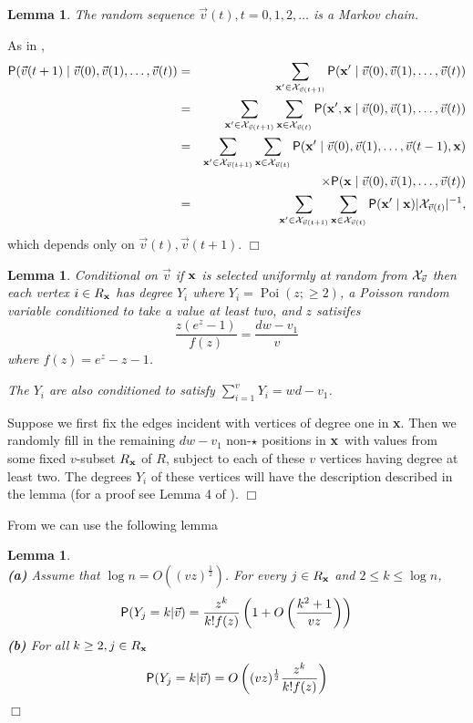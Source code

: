 \documentclass[11pt]{article}
\newcommand{\half}{\frac{1}{2}}
\newenvironment{proof}{{\bf Proof:}}{\hfill\mbox{$\Box$}}
\def\bx{{\bf x}}
\def\bx{{\bf x}}
\newcommand{\proofend}{\hspace*{\fill}\mbox{$\Box$}}
\def\cX{{\cal X}}
\def\Pr{{\sf P}}
\def\Gv{\cX_{\vv}}
\def\Poi{\mathop{\mathrm{Poi}}}
\def\vv{\vec{v}}
\newtheorem{lemma}[theorem]{Lemma}
\newcommand{\brac}[1]{\left(#1\right)}
\newcommand{\bfrac}[2]{\brac{\frac{#1}{#2}}}
\newcommand{\beq}[1]{\begin{equation}\label{#1}}
\newcommand{\eeq}{\end{equation}}
\begin{document}
\begin{lemma}
The random sequence $\vv(t), t=0,1,2,\ldots$ is a Markov chain.
\end{lemma}
\begin{proof}
As in \cite{AFP},
\begin{eqnarray*}
\Pr(\vv(t+1)\mid \vv(0),\vv(1),\ldots,\vv(t))&=&\sum_{\bx'\in
\cX_{\vv(t+1)}}\Pr(\bx'\mid 
\vv(0),\vv(1),\ldots,\vv(t))\\
&=&\sum_{\bx'\in \cX_{\vv(t+1)}}\sum_{\bx\in \cX_{\vv(t)}}\Pr(\bx',\bx\mid 
\vv(0),\vv(1),\ldots,\vv(t))\\
&=&\sum_{\bx'\in \cX_{\vv(t+1)}}\sum_{\bx\in \cX_{\vv(t)}}
\Pr(\bx'\mid \vv(0),\vv(1),\ldots,\vv(t-1),\bx)\\
&&\times \Pr(\bx\mid 
\vv(0),\vv(1),\ldots,\vv(t))\\
&=&\sum_{\bx'\in \cX_{\vv(t+1)}}\sum_{\bx\in \cX_{\vv(t)}}\Pr(\bx'\mid
\bx)|\cX_{\vv(t)}|^{-1},
\end{eqnarray*}
which depends only on $\vv(t),\vv(t+1)$.
\end{proof}


\begin{lemma}\label{trunp}
Conditional on $\vv$ if $\bx$ is selected uniformly at random from
$\Gv$ then each vertex $i\in R_\bx$ has degree $Y_i$ where $Y_i=\Poi(z;\ge 2)$, a Poisson random variable
conditioned to take a value at least two, and $z$ satisifes
\begin{equation}\label{zeqn}
\frac{z(e^z-1)}{f(z)}=\frac{dw-v_1}{v}
\end{equation}
where $f(z) = e^z-z-1$.

The $Y_i$ are also conditioned to satisfy
$\sum_{i=1}^{v}Y_i = wd-v_1$. 
\end{lemma}
\begin{proof}
Suppose we first fix the edges incident with vertices of degree one in \bx. Then we randomly fill in the remaining
$dw-v_1$ non-$\star$ positions in \bx\ with values from some fixed $v$-subset $R_\bx$ of $R$, subject to each of these $v$ vertices
having degree at least two. The degrees $Y_i$ of these vertices will have the description described in the lemma (for a proof 
see Lemma 4 of \cite{AFP}). 
\end{proof}

From \cite{AFP} we can use the following lemma
\begin{lemma} {\bf \cite{AFP}}\\
{\bf (a)} Assume that $\log n = O((vz)^\half)$. For every $j\in R_\bx$ and $2\le k \le \log n$,
\beq{eq0}
\Pr(Y_j = k | \vv) = \frac{z^k}{k!f(z)}\brac{1+O\bfrac{k^2+1}{vz}}
\eeq
{\bf (b)} For all $k\ge 2, j\in R_\bx$
$$
\Pr(Y_j = k | \vv) = O\brac{(vz)^\half \frac{z^k}{k!f(z)}}
$$
\end{lemma}
\proofend
\end{document}
